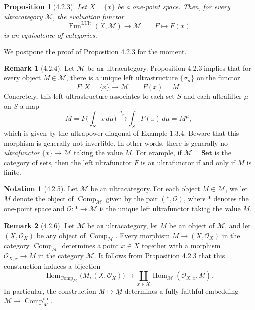 \documentclass[11pt]{article}
\theoremstyle{plain}
\newtheorem{proposition}{Proposition}
\theoremstyle{definition}
\newtheorem{remark}{Remark}
\newtheorem{notation}{Notation}
\newcommand{\Comp}{\operatorname{Comp}}
\newcommand{\FunLUlt}{\operatorname{Fun}^{\mathrm{LUlt}}}
\newcommand{\Hom}{\operatorname{Hom}}
\begin{document}
\begin{proposition}[4.2.3]
Let $X = \{x\}$ be a one-point space. Then, for every ultracategory $\mathcal{M}$, the evaluation functor
\[
\FunLUlt(X, \mathcal{M}) \to \mathcal{M} \qquad F \mapsto F(x)
\]
is an equivalence of categories.
\end{proposition}

We postpone the proof of Proposition 4.2.3 for the moment.

\begin{remark}[4.2.4]
Let $\mathcal{M}$ be an ultracategory. Proposition 4.2.3 implies that for every object $M \in \mathcal{M}$, there is a unique left ultrastructure $\{\sigma_\mu\}$ on the functor
\[
F : X = \{x\} \to \mathcal{M} \qquad F(x) = M.
\]
Concretely, this left ultrastructure associates to each set $S$ and each ultrafilter $\mu$ on $S$ a map
\[
M = F\Big(\int_S x \, d\mu\Big) \xrightarrow{\ \sigma_\mu\ } \int_S F(x) \, d\mu = M^{\mu},
\]
which is given by the ultrapower diagonal of Example 1.3.4. Beware that this morphism is generally not invertible. In other words, there is generally no \emph{ultrafunctor} $\{x\} \to \mathcal{M}$ taking the value $M$. For example, if $\mathcal{M} = \mathbf{Set}$ is the category of sets, then the left ultrafunctor $F$ is an ultrafunctor if and only if $M$ is finite.
\end{remark}

\begin{notation}[4.2.5]
Let $\mathcal{M}$ be an ultracategory. For each object $M \in \mathcal{M}$, we let $\underline{M}$ denote the object of $\Comp_{\mathcal{M}}$ given by the pair $(\ast, \mathcal{O})$, where $\ast$ denotes the one-point space and $\mathcal{O} : \ast \to \mathcal{M}$ is the unique left ultrafunctor taking the value $M$.
\end{notation}


\begin{remark}[4.2.6]
Let $\mathcal{M}$ be an ultracategory, let $M$ be an object of $\mathcal{M}$, and let $(X, \mathcal{O}_X)$ be any object of $\Comp_{\mathcal{M}}$. Every morphism $\underline{M} \to (X, \mathcal{O}_X)$ in the category $\Comp_{\mathcal{M}}$ determines a point $x \in X$ together with a morphism $\mathcal{O}_{X,x} \to M$ in the category $\mathcal{M}$. It follows from Proposition 4.2.3 that this construction induces a bijection
\[
\Hom_{\Comp_{\mathcal{M}}}\big(\underline{M}, (X, \mathcal{O}_X)\big) \to \coprod_{x \in X} \Hom_{\mathcal{M}}(\mathcal{O}_{X,x}, M).
\]
In particular, the construction $M \mapsto \underline{M}$ determines a fully faithful embedding $\mathcal{M} \to \Comp^{\mathrm{op}}_{\mathcal{M}}$.
\end{remark}
\end{document}
